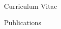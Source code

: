 \begin{cv}{\centerline{\LARGE Curriculum Vitae}}
\begin{cvlist}{Publications}
\begin{list}{}{\leftmargin=-1em}
%    
%    
%    
%    
%    
%    
%    
%    

\end{list}
\end{cvlist}
\end{cv}
